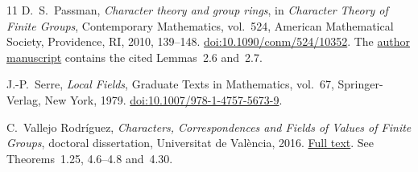 \documentclass[11pt,a4paper]{amsart}
\theoremstyle{remark}
\numberwithin{equation}{section}
\begin{document}
\begin{thebibliography}{11}
D.~S.~Passman,
\emph{Character theory and group rings},
in \emph{Character Theory of Finite Groups},
Contemporary Mathematics, vol.~524,
American Mathematical Society, Providence, RI, 2010, 139--148.
\href{https://doi.org/10.1090/conm/524/10352}{doi:10.1090/conm/524/10352}.
The \href{https://people.math.wisc.edu/~passman/charprob.pdf}{author manuscript}
contains the cited Lemmas~2.6 and~2.7.

J.-P.~Serre,
\emph{Local Fields},
Graduate Texts in Mathematics, vol.~67,
Springer-Verlag, New York, 1979.
\href{https://doi.org/10.1007/978-1-4757-5673-9}{doi:10.1007/978-1-4757-5673-9}.

C.~Vallejo Rodr\'iguez,
\emph{Characters, Correspondences and Fields of Values of Finite Groups},
doctoral dissertation, Universitat de Val\`encia, 2016.
\href{https://www.uv.es/cavaro3/download/Thesis.pdf}{Full text}.
See Theorems~1.25, 4.6--4.8 and~4.30.

\end{thebibliography}
\end{document}
